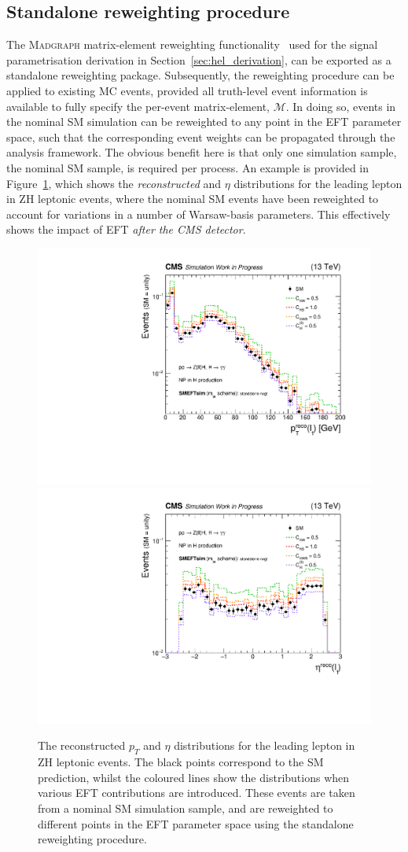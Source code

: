 \subsection{Standalone reweighting procedure}
The \textsc{Madgraph} matrix-element reweighting functionality~\cite{Mattelaer:2016gcx} used for the signal parametrisation derivation in Section~\ref{sec:hel_derivation}, can be exported as a standalone reweighting package. Subsequently, the reweighting procedure can be applied to existing MC events, provided all truth-level event information is available to fully specify the per-event matrix-element, $\mathcal{M}$. In doing so, events in the nominal SM simulation can be reweighted to any point in the EFT parameter space, such that the corresponding event weights can be propagated through the analysis framework. The obvious benefit here is that only one simulation sample, the nominal SM sample, is required per process. An example is provided in Figure~\ref{fig:standalone_rwgt}, which shows the \textit{reconstructed} \pt and $\eta$ distributions for the leading lepton in ZH leptonic events, where the nominal SM events have been reweighted to account for variations in a number of Warsaw-basis parameters. This effectively shows the impact of EFT \textit{after the CMS detector}.

\begin{figure}
  \centering
  \includegraphics[width=.49\textwidth]{Figures/eft/distributions/lep_pt_nanoaod.pdf}
  \includegraphics[width=.49\textwidth]{Figures/eft/distributions/lep_eta_nanoaod.pdf}
  \caption[Standalone reweighting of ZH leptonic events]
  {
    The reconstructed $p_T$ and $\eta$ distributions for the leading lepton in ZH leptonic events. The black points correspond to the SM prediction, whilst the coloured lines show the distributions when various EFT contributions are introduced. These events are taken from a nominal SM simulation sample, and are reweighted to different points in the EFT parameter space using the standalone reweighting procedure.
  }
  \label{fig:standalone_rwgt}
\end{figure}


